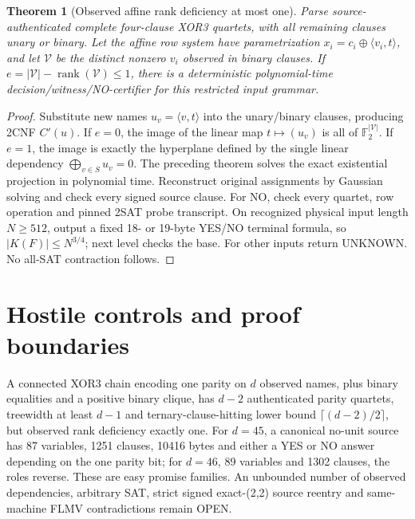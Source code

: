 \documentclass[11pt]{article}
\newtheorem{theorem}{Theorem}
\begin{document}
\begin{theorem}[Observed affine rank deficiency at most one]
Parse source-authenticated complete four-clause XOR3 quartets,
with all remaining clauses unary or binary. Let the affine
row system have parametrization
$x_i=c_i\oplus\langle v_i,t\rangle$, and let $\mathcal V$
be the distinct nonzero $v_i$ observed in binary clauses.
If $e=|\mathcal V|-\operatorname{rank}(\mathcal V)\le1$,
there is a deterministic polynomial-time decision/witness/NO-certifier
for this restricted input grammar.
\end{theorem}
\begin{proof}
Substitute new names $u_v=\langle v,t\rangle$ into
the unary/binary clauses, producing 2CNF $C'(u)$.
If $e=0$, the image of the linear map $t\mapsto(u_v)$
is all of $\mathbb F_2^{|\mathcal V|}$. If $e=1$,
the image is exactly the hyperplane defined by the single
linear dependency $\bigoplus_{v\in S}u_v=0$.
The preceding theorem solves the exact existential
projection in polynomial time. Reconstruct original assignments
by Gaussian solving and check every signed source clause.
For NO, check every quartet, row operation and pinned 2SAT
probe transcript. On recognized physical input length
$N\ge512$, output a fixed 18- or 19-byte YES/NO terminal
formula, so $|K(F)|\le N^{3/4}$; next level checks the base.
For other inputs return UNKNOWN. No all-SAT contraction follows.
\end{proof}
\section{Hostile controls and proof boundaries}
A connected XOR3 chain encoding one parity on $d$ observed names,
plus binary equalities and a positive binary clique, has
$d-2$ authenticated parity quartets, treewidth at least $d-1$
and ternary-clause-hitting lower bound $\lceil(d-2)/2\rceil$,
but observed rank deficiency exactly one. For $d=45$,
a canonical no-unit source has 87 variables, 1251 clauses,
10416 bytes and either a YES or NO answer depending on the
one parity bit; for $d=46$, 89 variables and 1302 clauses,
the roles reverse. These are easy promise families.
An unbounded number of observed dependencies, arbitrary SAT,
strict signed exact-(2,2) source reentry and same-machine
FLMV contradictions remain OPEN.
\end{document}
